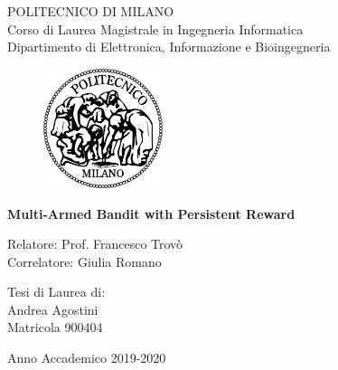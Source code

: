 \thispagestyle{empty}
\vspace*{-1.5cm} \bfseries{
\begin{center}
  \large
  POLITECNICO DI MILANO\\
  \normalsize
  Corso di Laurea Magistrale in Ingegneria 
  Informatica\\
  Dipartimento di Elettronica, Informazione e Bioingegneria\\
  \begin{figure}[htbp]
    \begin{center}
      \includegraphics[width=3.5cm]{./images/logopm}
    \end{center}
  \end{figure}
  \vspace*{0.3cm} \LARGE



  \textbf{Multi-Armed Bandit with Persistent Reward}


  \vspace*{.75truecm} \large

\end{center}
\vspace*{3.0cm} \large
\begin{flushleft}


  Relatore: Prof. Francesco Trovò  \\
  Correlatore: Giulia Romano\\

\end{flushleft}
\vspace*{1.0cm}
\begin{flushright}


  Tesi di Laurea di:\\ Andrea Agostini\\ Matricola 900404 \\


\end{flushright}
\vspace*{0.5cm}
\begin{center}



  Anno Accademico 2019-2020
\end{center} \clearpage
}
